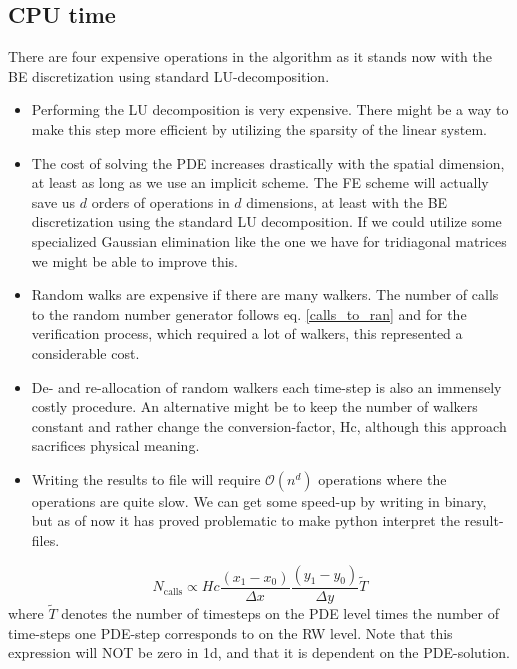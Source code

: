 \subsection{CPU time}
There are four expensive operations in the algorithm as it stands now with the BE discretization using standard LU-decomposition.
\begin{itemize}
\item Performing the LU decomposition is very expensive. There might be a way to make this step more efficient by utilizing the sparsity of the linear system.
\item The cost of solving the PDE increases drastically with the spatial dimension, at least as long as we use an implicit scheme. The FE scheme will actually save us $d$ orders of operations in $d$ dimensions, at least with the BE discretization using the standard LU decomposition. If we could utilize some specialized Gaussian elimination like the one we have for tridiagonal matrices we might be able to improve this.
\item Random walks are expensive if there are many walkers. The number of calls to the random number generator follows eq. \ref{calls_to_ran} and for the verification process, which required a lot of walkers, this represented a considerable cost.
\item De- and re-allocation of random walkers each time-step is also an immensely costly procedure. An alternative might be to keep the number of walkers constant and rather change the conversion-factor, Hc, although this approach sacrifices physical meaning.
\item Writing the results to file will require $\mathcal{O}(n^d)$ operations where the operations are quite slow. We can get some speed-up by writing in binary, but as of now it has proved problematic to make python interpret the result-files. 
\end{itemize}

\begin{equation}\label{calls_to_ran}
 N_{\text{calls}} \propto Hc\frac{(x_1-x_0)}{\Delta x}\frac{(y_1-y_0)}{\Delta y}\tilde{T}
\end{equation}
where $\tilde{T}$ denotes the number of timesteps on the PDE level times the number of time-steps one PDE-step corresponds to on the RW level. Note that this expression will NOT be zero in 1d, and that it is dependent on the PDE-solution.

